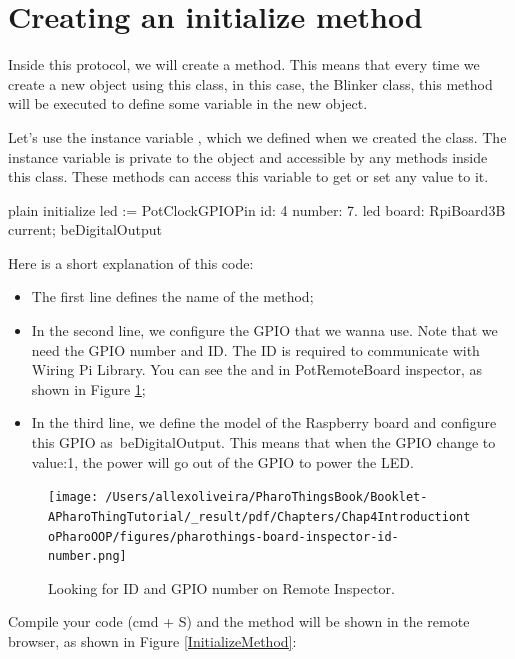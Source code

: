 \documentclass[10pt,twoside,english]{_support/latex/sbabook/sbabook}
\begin{document}
\section{Creating an initialize method}
Inside this protocol, we will create a  method. This means that every time we create a new object using this class, in this case, the Blinker class, this method will be executed to define some variable in the new object.

Let's use the instance variable , which we defined when we created the class. The instance variable is private to the object and accessible by any methods inside this class. These methods can access this variable to get or set any value to it.

\begin{displaycode}{plain}
initialize 
  led := PotClockGPIOPin id: 4 number: 7. 
  led board: RpiBoard3B current; beDigitalOutput
\end{displaycode}

Here is a short explanation of this code:

\begin{itemize}
\item The first line defines the name of the method;
\item In the second line, we configure the GPIO that we wanna use. Note that we need the GPIO number and ID. The ID is required to communicate with Wiring Pi Library. You can see the  and  in PotRemoteBoard inspector, as shown in Figure \ref{RemoteInspector};
\item In the third line, we define the model of the Raspberry board and configure this GPIO as beDigitalOutput. This means that when the GPIO change to value:1, the power will go out of the GPIO to power the LED.
\end{itemize}


\begin{figure}

\begin{center}
\texttt{[image: /Users/allexoliveira/PharoThingsBook/Booklet-APharoThingTutorial/\_result/pdf/Chapters/Chap4IntroductiontoPharoOOP/figures/pharothings-board-inspector-id-number.png]}\caption{Looking for ID and GPIO number on Remote Inspector.\label{RemoteInspector}}\end{center}
\end{figure}


Compile your code (cmd + S) and the method will be shown in the remote browser, as shown in Figure \ref{InitializeMethod}:
\end{document}
